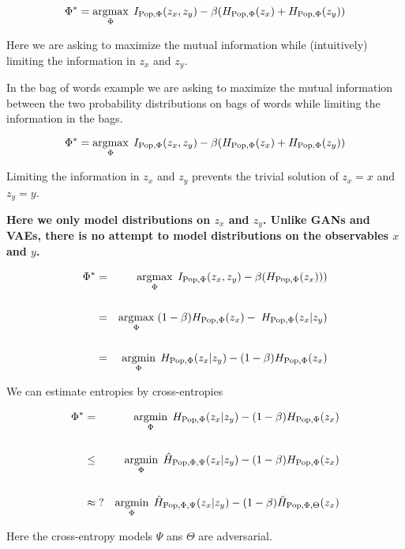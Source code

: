 {\vfill
$$\Phi^* = \operatorname*{argmax}_{\Phi} \; I_{\mathrm{Pop},\Phi}(z_x,z_y) - \beta (H_{\mathrm{Pop},\Phi}(z_x) + H_{\mathrm{Pop},\Phi}(z_y))$$

\vfill
Here we are asking to maximize the mutual information while (intuitively) limiting the information in $z_x$ and $z_y$.

\vfill
In the bag of words example we are asking to maximize the mutual information between the two probability distributions on bags of words while limiting the information in the bags.


$$\Phi^* = \operatorname*{argmax}_{\Phi} \; I_{\mathrm{Pop},\Phi}(z_x,z_y) - \beta (H_{\mathrm{Pop},\Phi}(z_x) + H_{\mathrm{Pop},\Phi}(z_y))$$

\vfill
Limiting the information in $z_x$ and $z_y$ prevents the trivial solution of $z_x = x$ and $z_y = y$.

\vfill
{\bf Here we only model distributions on $z_x$ and $z_y$.  Unlike GANs and VAEs, there is no attempt to model distributions on the observables $x$ and $y$.}


\begin{eqnarray*}
\Phi^* & = & \operatorname*{argmax}_{\Phi} \; I_{\mathrm{Pop},\Phi}(z_x,z_y) - \beta (H_{\mathrm{Pop},\Phi}(z_x))) \\
\\
 & = & \operatorname*{argmax}_{\Phi} \; (1-\beta)H_{\mathrm{Pop},\Phi}(z_x) -\; H_{\mathrm{Pop},\Phi}(z_x|z_y) \\
 \\
 & = & \operatorname*{argmin}_\Phi\;H_{\mathrm{Pop},\Phi}(z_x|z_y) - (1-\beta)H_{\mathrm{Pop},\Phi}(z_x)
\end{eqnarray*}


We can estimate entropies by cross-entropies

\begin{eqnarray*}
\Phi^* & = & \operatorname*{argmin}_\Phi\;H_{\mathrm{Pop},\Phi}(z_x|z_y) - (1-\beta)H_{\mathrm{Pop},\Phi}(z_x) \\
\\
& \leq & \operatorname*{argmin}_\Phi\;\hat{H}_{\mathrm{Pop},\Phi,\Psi}(z_x|z_y) - (1-\beta)H_{\mathrm{Pop},\Phi}(z_x) \\
\\
& \approx\mathrm{?} & \operatorname*{argmin}_\Phi\;\hat{H}_{\mathrm{Pop},\Phi,\Psi}(z_x|z_y) - (1-\beta)\hat{H}_{\mathrm{Pop},\Phi,\Theta}(z_x) \\
\end{eqnarray*}

Here the cross-entropy models $\Psi$ ans $\Theta$ are adversarial.

}
